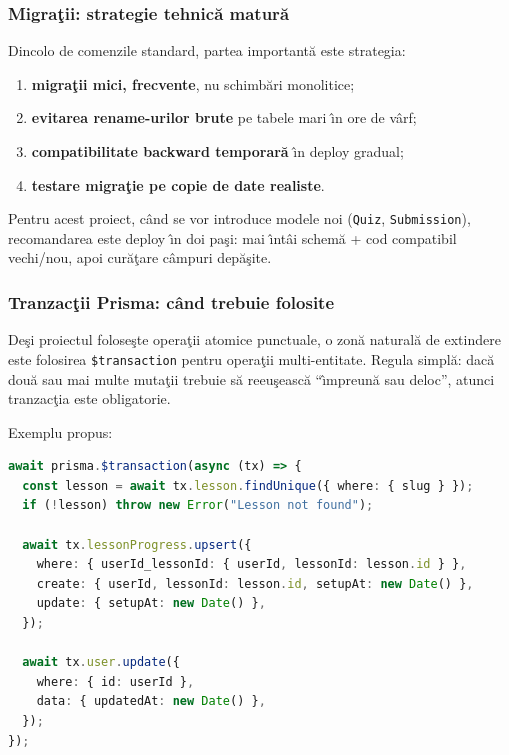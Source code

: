 \documentclass[12pt,onecolumn,draftclsnofoot]{IEEEtran}
\begin{document}
\newpage
\subsubsection{Migra\c{t}ii: strategie tehnic\u{a} matur\u{a}}
Dincolo de comenzile standard, partea important\u{a} este strategia:
\begin{enumerate}[label=\arabic*)]
  \item \textbf{migra\c{t}ii mici, frecvente}, nu schimb\u{a}ri monolitice;
  \item \textbf{evitarea rename-urilor brute} pe tabele mari \^{\i}n ore de v\^{a}rf;
  \item \textbf{compatibilitate backward temporar\u{a}} \^{\i}n deploy gradual;
  \item \textbf{testare migra\c{t}ie pe copie de date realiste}.
\end{enumerate}

Pentru acest proiect, c\^{a}nd se vor introduce modele noi (\texttt{Quiz}, \texttt{Submission}), recomandarea este deploy \^{\i}n doi pa\c{s}i: mai \^{\i}nt\^{a}i schem\u{a} + cod compatibil vechi/nou, apoi cur\u{a}\c{t}are c\^{a}mpuri dep\u{a}\c{s}ite.

\subsubsection{Tranzac\c{t}ii Prisma: c\^{a}nd trebuie folosite}
De\c{s}i proiectul folose\c{s}te opera\c{t}ii atomice punctuale, o zon\u{a} natural\u{a} de extindere este folosirea \texttt{\$transaction} pentru opera\c{t}ii multi-entitate. Regula simpl\u{a}: dac\u{a} dou\u{a} sau mai multe muta\c{t}ii trebuie s\u{a} reeu\c{s}easc\u{a} \enquote{\^{\i}mpreun\u{a} sau deloc}, atunci tranzac\c{t}ia este obligatorie.

Exemplu propus:
\begin{lstlisting}[language=TypeScript,caption={Pattern tranzac\c{t}ional recomandat}]
await prisma.$transaction(async (tx) => {
  const lesson = await tx.lesson.findUnique({ where: { slug } });
  if (!lesson) throw new Error("Lesson not found");

  await tx.lessonProgress.upsert({
    where: { userId_lessonId: { userId, lessonId: lesson.id } },
    create: { userId, lessonId: lesson.id, setupAt: new Date() },
    update: { setupAt: new Date() },
  });

  await tx.user.update({
    where: { id: userId },
    data: { updatedAt: new Date() },
  });
});
\end{lstlisting}
\end{document}
